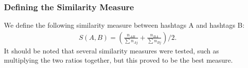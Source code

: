 \subsubsection{Defining the Similarity Measure}
We define the following similarity measure between hashtags A and hashtags B:
\begin{eqnarray}
S(A,B) = ( \frac{n_{AB}}{\sum n_{Aj}} + \frac{n_{BA} } {\sum n_{Bj}}) /2 . \nonumber
\end{eqnarray}
It should be noted that several similarity measures were tested, such as multiplying the two ratios together, but this proved to be the best measure.

\begin{figure}[tbh]
\centering
{}
\end{figure}
